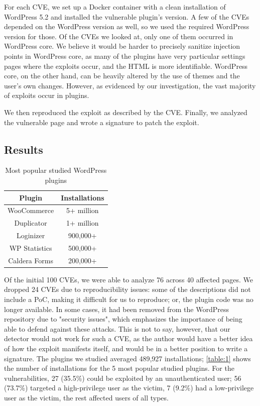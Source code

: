 For each CVE, we set up a Docker container with a clean installation of WordPress 5.2 and installed the vulnerable plugin's version. A few of the CVEs depended on the WordPress version as well, so we used the required WordPress version for those. Of the CVEs we looked at, only one of them occurred in WordPress core. We believe it would be harder to precisely sanitize injection points in WordPress core, as many of the plugins have very particular settings pages where the exploits occur, and the HTML is more identifiable. WordPress core, on the other hand, can be heavily altered by the use of themes and the user's own changes. However, as evidenced by our investigation, the vast majority of exploits occur in plugins.
 
 We then reproduced the exploit as described by the CVE. Finally, we analyzed the vulnerable page and wrote a signature to patch the exploit.

\subsection{Results}

\begin{table}[h!]
	\begin{center}
		\begin{tabular}{|c c|} 
			\hline
			Plugin & Installations\\ [1ex] 
			\hline
			WooCommerce  & 5+ million  \\  
			Duplicator & 1+ million \\  
			Loginizer & 900,000+ \\  
			WP Statistics & 500,000+ \\  
			Caldera Forms & 200,000+ \\   
			\hline
		\end{tabular}
		\caption{Most popular studied WordPress plugins}
		\label{table:1}
	\end{center}
\end{table}

Of the initial 100 CVEs, we were able to analyze 76 across 40 affected pages. We dropped 24 CVEs due to reproducibility issues: some of the descriptions did not include a PoC, making it difficult for us to reproduce; or, the plugin code was no longer available. In some cases, it had been removed from the WordPress repository due to "security issues", which emphasizes the importance of being able to defend against these attacks. This is not to say, however, that our detector would not work for such a CVE, as the author would have a better idea of how the exploit manifests itself, and would be in a better position to write a signature. The plugins we studied averaged 489,927 installations; \autoref{table:1} shows the number of installations for the 5 most popular studied plugins. For the vulnerabilities, 27 (35.5\%) could be exploited by an unauthenticated user; 56 (73.7\%) targeted a high-privilege user as the victim, 7 (9.2\%) had a low-privilege user as the victim, the rest affected users of all types.

